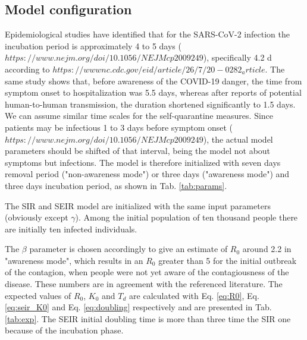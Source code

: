 \documentclass[DIV=12, BCOR=0pt]{scrartcl}  %
\begin{document}
  \subsection{Model configuration}
	Epidemiological studies have identified that for the SARS-CoV-2 infection the incubation period is approximately 4 to 5 days ($https://www.nejm.org/doi/10.1056/NEJMcp2009249$), specifically 4.2 d according to $https://wwwnc.cdc.gov/eid/article/26/7/20-0282_article$. The same study shows that, before awareness of the COVID-19 danger, the time from symptom onset to hospitalization was 5.5 days, whereas after reports of potential human-to-human transmission, the duration shortened significantly to 1.5 days. We can assume similar time scales for the self-quarantine measures. Since patients may be infectious 1 to 3 days before symptom onset ($https://www.nejm.org/doi/10.1056/NEJMcp2009249$), the actual model parameters should be shifted of that interval, being the model not about symptoms but infections. 
  The model is therefore initialized with seven days removal period ("non-awareness mode") or three days ("awareness mode") and three days incubation period, as shown in Tab. \ref{tab:params}. 
  
  
 
  The SIR and SEIR model are initialized with the same input parameters (obviously except $\gamma$). Among the initial population of ten thousand people there are initially ten infected individuals. 
  
  The $\beta$ parameter is chosen accordingly to give an estimate of $R_0$ around 2.2 in "awareness mode", which results in an $R_0$ greater than 5 for the initial outbreak of the contagion, when people were not yet aware of the contagiousness of the disease. These numbers are in agreement with the referenced literature.
  The expected values of $R_0$, $K_0$ and $T_d$ are calculated with Eq. \ref{eq:R0}, Eq. \ref{eq:seir_K0} and Eq. \ref{eq:doubling} respectively and are presented in Tab. \ref{tab:exp}. The SEIR initial doubling time is more than three time the SIR one because of the incubation phase.
\end{document}
